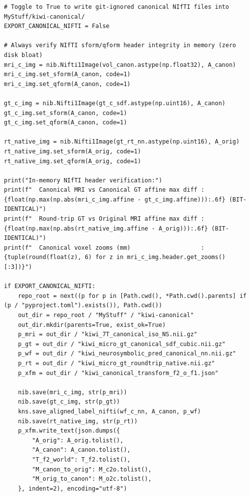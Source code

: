 \documentclass[10pt,a4paper]{article}
\renewcommand{\_}{\origunderscore\allowbreak}
\begin{document}
\begin{codebox}
\begin{lstlisting}[style=pybmed]
# Toggle to True to write git-ignored canonical NIfTI files into MyStuff/kiwi-canonical/
EXPORT_CANONICAL_NIFTI = False

# Always verify NIfTI sform/qform header integrity in memory (zero disk bloat)
mri_c_img = nib.Nifti1Image(vol_canon.astype(np.float32), A_canon)
mri_c_img.set_sform(A_canon, code=1)
mri_c_img.set_qform(A_canon, code=1)

gt_c_img = nib.Nifti1Image(gt_c_sdf.astype(np.uint16), A_canon)
gt_c_img.set_sform(A_canon, code=1)
gt_c_img.set_qform(A_canon, code=1)

rt_native_img = nib.Nifti1Image(gt_rt_nn.astype(np.uint16), A_orig)
rt_native_img.set_sform(A_orig, code=1)
rt_native_img.set_qform(A_orig, code=1)

print("In-memory NIfTI header verification:")
print(f"  Canonical MRI vs Canonical GT affine max diff : {float(np.max(np.abs(mri_c_img.affine - gt_c_img.affine))):.6f} (BIT-IDENTICAL)")
print(f"  Round-trip GT vs Original MRI affine max diff : {float(np.max(np.abs(rt_native_img.affine - A_orig))):.6f} (BIT-IDENTICAL)")
print(f"  Canonical voxel zooms (mm)                    : {tuple(round(float(z), 6) for z in mri_c_img.header.get_zooms()[:3])}")

if EXPORT_CANONICAL_NIFTI:
    repo_root = next((p for p in [Path.cwd(), *Path.cwd().parents] if (p / "pyproject.toml").exists()), Path.cwd())
    out_dir = repo_root / "MyStuff" / "kiwi-canonical"
    out_dir.mkdir(parents=True, exist_ok=True)
    p_mri = out_dir / "kiwi_7T_canonical_iso_NS.nii.gz"
    p_gt = out_dir / "kiwi_micro_gt_canonical_sdf_cubic.nii.gz"
    p_wf = out_dir / "kiwi_neurosymbolic_pred_canonical_nn.nii.gz"
    p_rt = out_dir / "kiwi_micro_gt_roundtrip_native.nii.gz"
    p_xfm = out_dir / "kiwi_canonical_transform_f2_o_f1.json"

    nib.save(mri_c_img, str(p_mri))
    nib.save(gt_c_img, str(p_gt))
    kns.save_aligned_label_nifti(wf_c_nn, A_canon, p_wf)
    nib.save(rt_native_img, str(p_rt))
    p_xfm.write_text(json.dumps({
        "A_orig": A_orig.tolist(),
        "A_canon": A_canon.tolist(),
        "T_f2_world": T_f2.tolist(),
        "M_canon_to_orig": M_c2o.tolist(),
        "M_orig_to_canon": M_o2c.tolist(),
    }, indent=2), encoding="utf-8")


\end{lstlisting}
\end{codebox}
\end{document}
